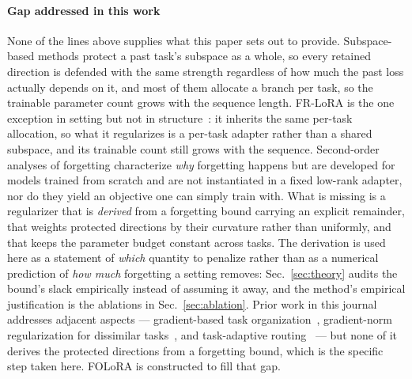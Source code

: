 \paragraph{Gap addressed in this work}
None of the lines above supplies what this paper sets out to provide. Subspace-based
methods \cite{wang2023olora,liang2024inflora,wang2021adamnsc} protect a past task's
subspace as a whole, so every retained direction is defended with the same strength
regardless of how much the past loss actually depends on it, and most of them allocate a
branch per task, so the trainable parameter count grows with the sequence length. FR-LoRA
is the one exception in setting but not in structure~\cite{adhikari2025frlora}: it inherits
the same per-task allocation, so what it regularizes is a per-task adapter rather than a
shared subspace, and its trainable count still grows with the sequence.
Second-order analyses of forgetting \cite{nguyen2019toward,doan2021theoretical}
characterize \emph{why} forgetting happens but are developed for models trained from
scratch and are not instantiated in a fixed low-rank adapter, nor do they yield an
objective one can simply train with. What is missing is a
regularizer that is \emph{derived} from a forgetting bound carrying an explicit remainder,
that weights protected directions by their curvature rather than uniformly, and that keeps
the parameter budget constant across tasks. The derivation is used here as a statement of
\emph{which} quantity to penalize rather than as a numerical prediction of \emph{how much}
forgetting a setting removes: Sec.~\ref{sec:theory} audits the bound's slack empirically
instead of assuming it away, and the method's empirical justification is the ablations in
Sec.~\ref{sec:ablation}. Prior work in this journal addresses adjacent
aspects --- gradient-based task organization~\cite{huang2026gradtaskorg}, gradient-norm
regularization for dissimilar tasks~\cite{wang2026gnr}, and task-adaptive
routing~\cite{pan2026prototype} --- but none of it derives the protected directions from a
forgetting bound, which is the specific step taken here. FOLoRA is constructed to fill that
gap.
